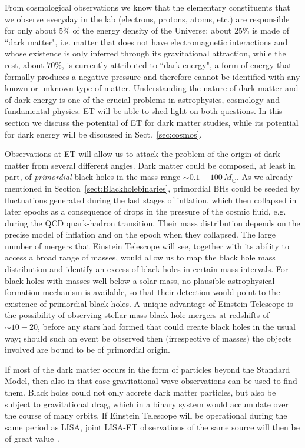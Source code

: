 From cosmological observations we know that the elementary constituents that we observe everyday in the lab (electrons, protons, atoms, etc.) are responsible for only about $5\%$ of the energy density of the Universe; about $25\%$ is made of ``dark matter", i.e. matter that does not have electromagnetic interactions and whose existence is only inferred through its gravitational attraction, while the rest, about $70\%$, is currently attributed to ``dark energy", a form of energy that formally produces a negative pressure and therefore cannot be identified with any known or unknown type of matter. Understanding the nature of dark matter and of dark energy is one of the crucial problems in astrophysics, cosmology and fundamental physics.  ET will be able to  shed light on both questions. In this section we discuss the potential of ET for dark matter studies, while 
its potential for dark energy will be discussed in Sect.~\ref{sec:cosmos}.

Observations at ET will allow us to attack the problem of the origin of dark matter from several different angles. Dark matter could be composed, at least in part, of \emph{primordial} black holes in the mass range $\sim 0.1 - 100\,M_\odot$. As we already mentioned in Section~\ref{sect:Blackholebinaries},
primordial BHs  could be seeded by fluctuations generated during the 
last stages of inflation, which then collapsed in later epochs as a consequence of drops in the pressure of the cosmic fluid, e.g. during the  QCD quark-hadron transition. Their mass distribution depends on the precise model 
of inflation and on the epoch when they  collapsed. The large number of mergers that Einstein Telescope
will see, together with its  ability to access a broad range of masses, would allow us to map the black hole mass distribution
and identify an excess of black holes in certain mass intervals. For black holes with masses well below a 
solar mass, no plausible astrophysical formation mechanism is available, so that their detection would
point to the existence of primordial black holes. A unique advantage of Einstein Telescope is the possibility of observing stellar-mass black hole mergers at redshifts of $\sim 10-20$, before
any stars had formed that could create black holes in the usual way; 
should such an event be observed then (irrespective of masses) 
the objects involved are bound to be of primordial origin.

If most of the dark matter occurs in the form of particles beyond the Standard Model, 
then also in that case gravitational wave observations can be used to find them. Black holes
could not only accrete dark matter particles, but also be subject to gravitational drag, which 
in a binary system would accumulate over the course of many orbits. If Einstein 
Telescope will be operational during the same period as LISA, joint LISA-ET observations
of the same source will then be of great value~\cite{Barausse:2016eii}.

